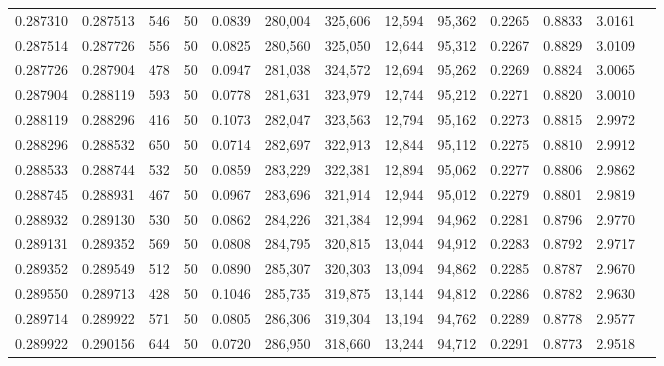 \begin{tabular}{rrrrrrrrrrrrr}
0.287310 & 0.287513 &   546 &  50 &                                     0.0839 & 280,004 & 325,606 &  12,594 &  95,362 & 0.2265 & 0.8833 & 3.0161 \\
0.287514 & 0.287726 &   556 &  50 &                                     0.0825 & 280,560 & 325,050 &  12,644 &  95,312 & 0.2267 & 0.8829 & 3.0109 \\
0.287726 & 0.287904 &   478 &  50 &                                     0.0947 & 281,038 & 324,572 &  12,694 &  95,262 & 0.2269 & 0.8824 & 3.0065 \\
0.287904 & 0.288119 &   593 &  50 &                                     0.0778 & 281,631 & 323,979 &  12,744 &  95,212 & 0.2271 & 0.8820 & 3.0010 \\
0.288119 & 0.288296 &   416 &  50 &                                     0.1073 & 282,047 & 323,563 &  12,794 &  95,162 & 0.2273 & 0.8815 & 2.9972 \\
0.288296 & 0.288532 &   650 &  50 &                                     0.0714 & 282,697 & 322,913 &  12,844 &  95,112 & 0.2275 & 0.8810 & 2.9912 \\
0.288533 & 0.288744 &   532 &  50 &                                     0.0859 & 283,229 & 322,381 &  12,894 &  95,062 & 0.2277 & 0.8806 & 2.9862 \\
0.288745 & 0.288931 &   467 &  50 &                                     0.0967 & 283,696 & 321,914 &  12,944 &  95,012 & 0.2279 & 0.8801 & 2.9819 \\
0.288932 & 0.289130 &   530 &  50 &                                     0.0862 & 284,226 & 321,384 &  12,994 &  94,962 & 0.2281 & 0.8796 & 2.9770 \\
0.289131 & 0.289352 &   569 &  50 &                                     0.0808 & 284,795 & 320,815 &  13,044 &  94,912 & 0.2283 & 0.8792 & 2.9717 \\
0.289352 & 0.289549 &   512 &  50 &                                     0.0890 & 285,307 & 320,303 &  13,094 &  94,862 & 0.2285 & 0.8787 & 2.9670 \\
0.289550 & 0.289713 &   428 &  50 &                                     0.1046 & 285,735 & 319,875 &  13,144 &  94,812 & 0.2286 & 0.8782 & 2.9630 \\
0.289714 & 0.289922 &   571 &  50 &                                     0.0805 & 286,306 & 319,304 &  13,194 &  94,762 & 0.2289 & 0.8778 & 2.9577 \\
0.289922 & 0.290156 &   644 &  50 &                                     0.0720 & 286,950 & 318,660 &  13,244 &  94,712 & 0.2291 & 0.8773 & 2.9518 \\

\end{tabular}
